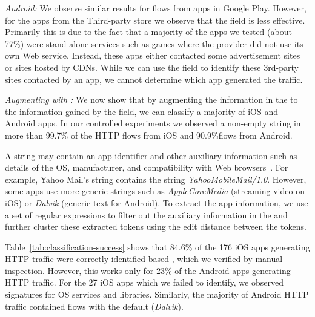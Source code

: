 \emph{Android:} We observe similar results for flows from apps in Google Play.
However, for the apps from the Third-party store we observe that the \httphost field is less effective. 
Primarily this is due to the fact that a majority of the apps we tested (about 77\%) were stand-alone services such as games where the provider did not use its own Web service. 
Instead, these apps either contacted some advertisement sites or sites hosted by CDNs. 
While we can use the \httphost field to identify these 3rd-party sites contacted by an app, we cannot determine which app generated the traffic. 

\emph{Augmenting with \useragent: } We now show that by augmenting the information in the \useragent to the information gained by the \httphost field, we can classify a majority of iOS and Android apps. 
In our controlled experiments we observed a non-empty \useragent string in more than 99.7\% of the HTTP flows from iOS and 90.9\%flows from Android. 

A \useragent string may contain an app identifier and other auxiliary information such as details of the OS, manufacturer, and compatibility with Web browsers~\cite{mozilla:useragentdetection}. 
For example, Yahoo Mail's \useragent string contains the string \emph{YahooMobileMail/1.0}. 
However, some apps use more generic \useragent strings such as \emph{AppleCoreMedia} (streaming video on iOS) or \emph{Dalvik} (generic text for Android). 
To extract the app information, we use a set of regular expressions to filter out the auxiliary information in the \useragent and further cluster these extracted tokens using the edit distance between the tokens.

Table~\ref{tab:classification-success} shows that 84.6\% of the 176 iOS apps generating HTTP traffic were correctly identified based \useragent, which we verified by manual inspection.
However, this works only for 23\% of the Android apps generating HTTP traffic. 
For the 27 iOS apps which we failed to identify, we observed signatures for OS services and libraries.
Similarly, the majority of Android HTTP traffic contained flows with the default \useragent (\emph{Dalvik}).

